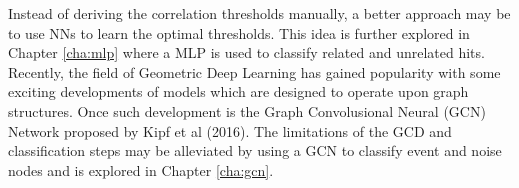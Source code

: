 Instead of deriving the correlation thresholds manually, a better
approach may be to use NNs to learn the optimal thresholds. This idea
is further explored in Chapter \ref{cha:mlp} where a MLP is used to
classify related and unrelated hits. Recently, the field of Geometric
Deep Learning has gained popularity with some exciting developments of
models which are designed to operate upon graph structures. Once such
development is the Graph Convolusional Neural (GCN) Network proposed
by Kipf et al (2016). The limitations of the GCD and classification
steps may be alleviated by using a GCN to classify event and noise
nodes and is explored in Chapter \ref{cha:gcn}.
